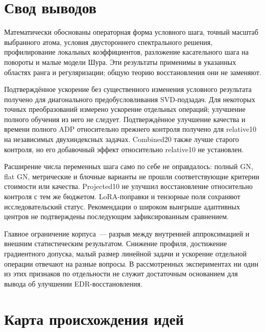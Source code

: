 \documentclass[11pt,a4paper]{article}
\numberwithin{equation}{section}
\begin{document}
\section{Свод выводов}
\label{sec:conclusions}

Математически обоснованы операторная форма условного шага,
точный масштаб выбранного атома, условия двустороннего спектрального
решения, профилирование локальных коэффициентов, разложение касательного
шага на повороты и малые модели Шура. Эти результаты применимы в указанных областях ранга
и регуляризации; общую теорию восстановления они не заменяют.

Подтверждённое ускорение без существенного изменения условного результата
получено для диагонального предобусловливания SVD-подзадач.
Для некоторых точных преобразований измерено ускорение отдельных
операций; улучшение полного обучения из него не следует.
Подтверждённое улучшение качества
и времени полного ADP относительно прежнего контроля получено
для relative10 на независимых двухиндексных задачах.
Combined20 также лучше старого контроля, но его добавочный эффект
относительно relative10 не установлен.

Расширение числа переменных шага само по себе не оправдалось:
полный GN, flat GN, метрические и блочные варианты не прошли
соответствующие критерии стоимости или качества. Projected10
не улучшил восстановление относительно контроля с тем же бюджетом.
LoRA-поправки и тензорные поля сохраняют исследовательский статус.
Рекомендации о широком выигрыше адаптивных центров не подтверждены
последующим зафиксированным сравнением.

Главное ограничение корпуса~--- разрыв между внутренней аппроксимацией
и внешним статистическим результатом. Снижение профиля, достижение
градиентного допуска, малый размер линейной задачи и ускорение отдельной
операции отвечают на разные вопросы. В рассмотренных экспериментах
ни один из этих признаков по отдельности не служит достаточным
основанием для вывода об улучшении EDR-восстановления.

\appendix
\section{Карта происхождения идей}\label{sec:corpus}
\end{document}
